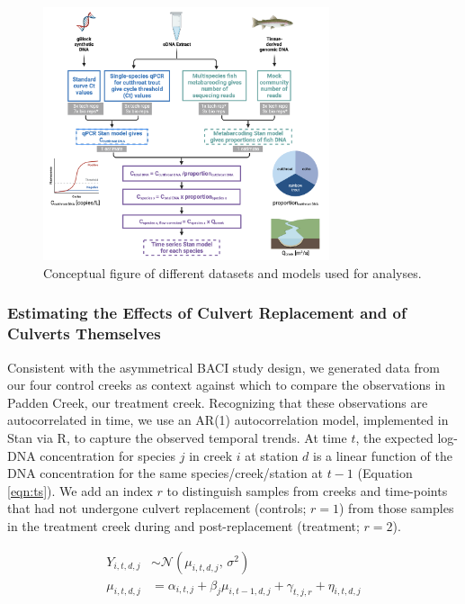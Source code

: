 \documentclass[
]{article}
\begin{document}
\begin{figure}
\centering
\includegraphics[width=0.75\textwidth,height=\textheight]{../Output/Figures/conceptual_figure.png}
\caption{Conceptual figure of different datasets and models used for
analyses.\label{fig:conceptualfig}}
\end{figure}

\hypertarget{estimating-the-effects-of-culvert-replacement-and-of-culverts-themselves}{%
\subsubsection{Estimating the Effects of Culvert Replacement and of
Culverts
Themselves}\label{estimating-the-effects-of-culvert-replacement-and-of-culverts-themselves}}

Consistent with the asymmetrical BACI study design, we generated data
from our four control creeks as context against which to compare the
observations in Padden Creek, our treatment creek. Recognizing that
these observations are autocorrelated in time, we use an AR(1)
autocorrelation model, implemented in Stan via R, to capture the
observed temporal trends. At time \(t\), the expected log-DNA
concentration for species \(j\) in creek \(i\) at station \(d\) is a
linear function of the DNA concentration for the same
species/creek/station at \(t-1\) (Equation \ref{eqn:ts}). We add an
index \(r\) to distinguish samples from creeks and time-points that had
not undergone culvert replacement (controls; \(r = 1\)) from those
samples in the treatment creek during and post-replacement (treatment;
\(r = 2\)).

\begin{align*}\label{eqn:ts}
 Y_{i,t,d,j} &\sim \mathcal{N}(\mu_{i,t,d,j},\,\sigma^{2})\\
\mu_{i,t,d,j} &= \alpha_{i,t,j} + \beta_{j}\mu_{i,t-1,d,j} + \gamma_{t,j,r} + \eta_{i,t,d,j}\tag{1}\\ 
\end{align*}
\end{document}
